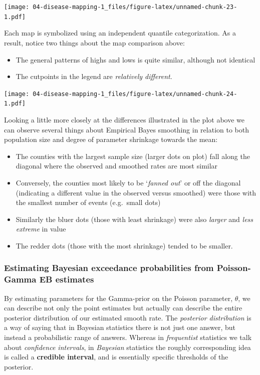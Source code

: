 \documentclass[
]{book}
\providecommand{\tightlist}{%
  \setlength{\itemsep}{0pt}\setlength{\parskip}{0pt}}
\begin{document}
\texttt{[image: 04-disease-mapping-1\_files/figure-latex/unnamed-chunk-23-1.pdf]}

Each map is symbolized using an independent quantile categorization. As a result, notice two things about the map comparison above:

\begin{itemize}
\tightlist
\item
  The general patterns of highs and lows is quite similar, although not identical
\item
  The cutpoints in the legend are \emph{relatively different}.
\end{itemize}

\texttt{[image: 04-disease-mapping-1\_files/figure-latex/unnamed-chunk-24-1.pdf]}

Looking a little more closely at the differences illustrated in the plot above we can observe several things about Empirical Bayes smoothing in relation to both population size and degree of parameter shrinkage towards the mean:

\begin{itemize}
\tightlist
\item
  The counties with the largest sample size (larger dots on plot) fall along the diagonal where the observed and smoothed rates are most similar
\item
  Conversely, the counties most likely to be `\emph{fanned out}' or off the diagonal (indicating a different value in the observed versus smoothed) were those with the smallest number of events (e.g.~small dots)
\item
  Similarly the bluer dots (those with least shrinkage) were also \emph{larger} and \emph{less extreme} in value
\item
  The redder dots (those with the most shrinkage) tended to be smaller.
\end{itemize}

\hypertarget{estimating-bayesian-exceedance-probabilities-from-poisson-gamma-eb-estimates}{%
\subsubsection{Estimating Bayesian exceedance probabilities from Poisson-Gamma EB estimates}\label{estimating-bayesian-exceedance-probabilities-from-poisson-gamma-eb-estimates}}

By estimating parameters for the Gamma-prior on the Poisson parameter, \(\theta\), we can describe not only the point estimates but actually can describe the entire posterior distribution of our estimated smooth rate. The \emph{posterior distribution} is a way of saying that in Bayesian statistics there is not just one answer, but instead a probabilistic range of answers. Whereas in \emph{frequentist} statistics we talk about \emph{confidence intervals}, in \emph{Bayesian} statistics the roughly corresponding idea is called a \textbf{credible interval}, and is essentially specific thresholds of the posterior.
\end{document}
